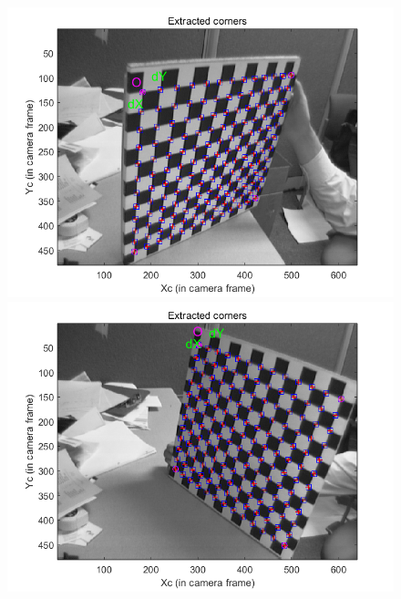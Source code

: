 \documentclass[12pt, a4paper, oneside]{ctexart}
\numberwithin{equation}{section}  %
\begin{document}
\begin{figure}[htbp]
{\begin{minipage}[b]{0.45\linewidth}
        \end{minipage}
    }
    \hspace*{-4cm}
    \subfigure
    {
        \begin{minipage}[b]{0.6\linewidth}
            \centering
            \includegraphics[scale=0.6]{角点3.png}
        \end{minipage}
        \begin{minipage}[b]{0.45\linewidth}
            \centering
            \includegraphics[scale=0.6]{角点4.png}
        \end{minipage}
    }
\end{figure}
\end{document}
